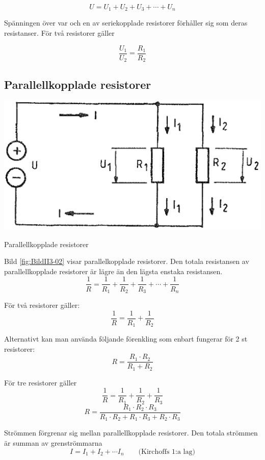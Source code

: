 \[   U = U_1 + U_2 + U_3 + \cdots + U_n   \]

Spänningen över var och en av seriekopplade resistorer förhåller sig som deras
resistanser. För två resistorer gäller

\[   \dfrac{U_1}{U_2} = \dfrac{R_1}{R_2}  \]


\subsection{Parallellkopplade resistorer}

\begin{marginfigure}
\includegraphics[width=\textwidth]{images/cropped_pdfs/bild_2_3-02.pdf}
\caption{Parallellkopplade resistorer}
\label{fig:BildII3-02}
\end{marginfigure}

Bild \ref{fig:BildII3-02} visar parallelkopplade resistorer.
Den totala resistansen av parallellkopplade resistorer är lägre än den lägsta
enstaka resistansen.
\[ \frac{1}{R} = \frac{1}{R_1} + \frac{1}{R_2} +
   \frac{1}{R_3} + \cdots + \frac{1}{R_n} \]

För två resistorer gäller:
\[\frac{1}{R} = \frac{1}{R_1} + \frac{1}{R_2}\]

Alternativt kan man använda följande förenkling som enbart fungerar
för 2 st resistorer:
\[R = \frac{R_1 \cdot R_2}{R_1 + R_2}\]

För tre resistorer gäller
\[ \frac{1}{R} = \frac{1}{R_1} + \frac{1}{R_2} + \frac{1}{R_3} \]
\[ R = \frac{R_1\cdot R_2\cdot R_3}{R_1\cdot R_2 + R_1\cdot R_3 + R_2\cdot R_3} \]

Strömmen förgrenar sig mellan parallellkopplade resistorer.
Den totala strömmen är summan av grenströmmarna
\[ I = I_1 + I_2 + \cdots I_n  \qquad \text{(Kirchoffs 1:a lag)}\]

